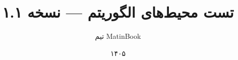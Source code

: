 
\documentclass{matinbook}

\title{تست محیط‌های الگوریتم — نسخه ۱.۱}
\author{تیم MatinBook}
\date{۱۴۰۵}




\maketitle

\listofalgorithms

\chapter{بررسی محیط‌های الگوریتم}
\label{chap:test-algorithm}

این سند، محیط‌های الگوریتم را بررسی می‌کند.

\section{الگوریتم پایه}
\label{sec:basic-algorithm}

\begin{latin}
\begin{algorithm}
\caption{محاسبه فاکتوریل}
\label{alg:factorial}
\begin{algorithmic}[1]
    \Require عدد صحیح $n $
    \Ensure $n!$
    \State $result $
        \State $result \gets result \times i$
    \EndFor
    \State \Return $result$
\end{algorithmic}
\end{algorithm}
\end{latin}

\section{الگوریتم جستجوی دودویی}
\label{sec:binary-search}

